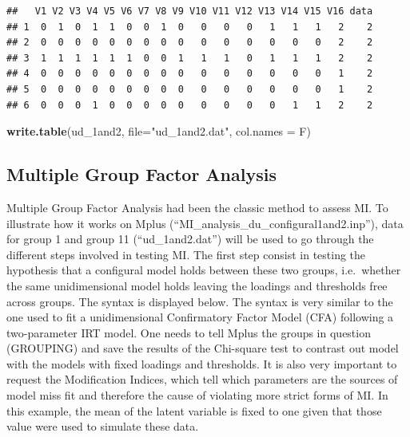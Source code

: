 \documentclass[]{book}
\newenvironment{Shaded}{\begin{snugshade}}{\end{snugshade}}
\newcommand{\DataTypeTok}[1]{\textcolor[rgb]{0.13,0.29,0.53}{#1}}
\newcommand{\DecValTok}[1]{\textcolor[rgb]{0.00,0.00,0.81}{#1}}
\newcommand{\KeywordTok}[1]{\textcolor[rgb]{0.13,0.29,0.53}{\textbf{#1}}}
\newcommand{\NormalTok}[1]{#1}
\newcommand{\OperatorTok}[1]{\textcolor[rgb]{0.81,0.36,0.00}{\textbf{#1}}}
\newcommand{\StringTok}[1]{\textcolor[rgb]{0.31,0.60,0.02}{#1}}
\begin{document}
\begin{Shaded}
\end{Shaded}

\begin{verbatim}
##   V1 V2 V3 V4 V5 V6 V7 V8 V9 V10 V11 V12 V13 V14 V15 V16 data
## 1  0  1  0  1  1  0  0  1  0   0   0   0   1   1   1   2    2
## 2  0  0  0  0  0  0  0  0  0   0   0   0   0   0   0   2    2
## 3  1  1  1  1  1  1  0  0  1   1   1   0   1   1   1   2    2
## 4  0  0  0  0  0  0  0  0  0   0   0   0   0   0   0   1    2
## 5  0  0  0  0  0  0  0  0  0   0   0   0   0   0   0   1    2
## 6  0  0  0  1  0  0  0  0  0   0   0   0   0   1   1   2    2
\end{verbatim}

\begin{Shaded}
\begin{Highlighting}[]
\KeywordTok{write.table}\NormalTok{(ud_1and2, }\DataTypeTok{file=}\StringTok{"ud_1and2.dat"}\NormalTok{, }\DataTypeTok{col.names =}\NormalTok{ F)}
\end{Highlighting}
\end{Shaded}

\hypertarget{multiple-group-factor-analysis}{%
\subsection{Multiple Group Factor Analysis}\label{multiple-group-factor-analysis}}

Multiple Group Factor Analysis had been the classic method to assess MI. To illustrate how it works on Mplus (``MI\_analysis\_du\_configural1and2.inp''), data for group 1 and group 11 (``ud\_1and2.dat'') will be used to go through the different steps involved in testing MI. The first step consist in testing the hypothesis that a configural model holds between these two groups, i.e.~whether the same unidimensional model holds leaving the loadings and thresholds free across groups. The syntax is displayed below. The syntax is very similar to the one used to fit a unidimensional Confirmatory Factor Model (CFA) following a two-parameter IRT model. One needs to tell Mplus the groups in question (GROUPING) and save the results of the Chi-square test to contrast out model with the models with fixed loadings and thresholds. It is also very important to request the Modification Indices, which tell which parameters are the sources of model miss fit and therefore the cause of violating more strict forms of MI. In this example, the mean of the latent variable is fixed to one given that those value were used to simulate these data.
\end{document}

